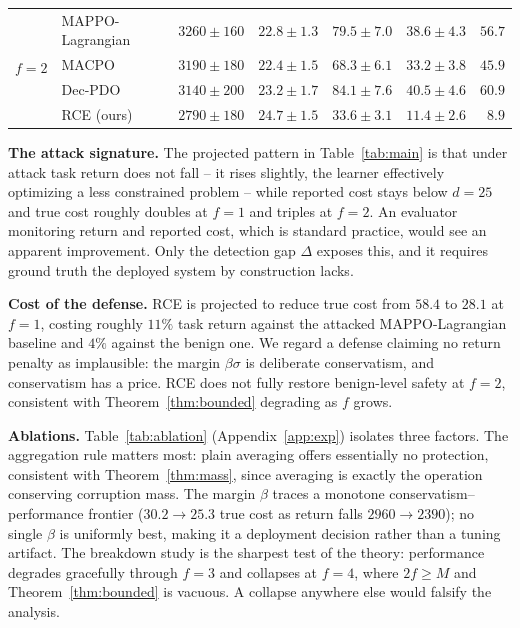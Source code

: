 \documentclass{article}
\begin{document}
\begin{table}[t]
\begin{tabular}{@{}llrrrrr@{}}
\midrule
\multirow{4}{*}{$f{=}2$}
 & MAPPO-Lagrangian & $3260 \pm 160$ & $22.8 \pm 1.3$ & $79.5 \pm 7.0$ & $38.6 \pm 4.3$ & $56.7$ \\
 & MACPO            & $3190 \pm 180$ & $22.4 \pm 1.5$ & $68.3 \pm 6.1$ & $33.2 \pm 3.8$ & $45.9$ \\
 & Dec-PDO          & $3140 \pm 200$ & $23.2 \pm 1.7$ & $84.1 \pm 7.6$ & $40.5 \pm 4.6$ & $60.9$ \\
 & RCE (ours)       & $2790 \pm 180$ & $24.7 \pm 1.5$ & $33.6 \pm 3.1$ & $11.4 \pm 2.6$ & $8.9$ \\
\bottomrule
\end{tabular}
\end{table}

\textbf{The attack signature.} The projected pattern in Table~\ref{tab:main} is that under attack task return does not fall -- it rises slightly, the learner effectively optimizing a less constrained problem -- while reported cost stays below $d=25$ and true cost roughly doubles at $f=1$ and triples at $f=2$. An evaluator monitoring return and reported cost, which is standard practice, would see an apparent improvement. Only the detection gap $\Delta$ exposes this, and it requires ground truth the deployed system by construction lacks.

\textbf{Cost of the defense.} RCE is projected to reduce true cost from $58.4$ to $28.1$ at $f=1$, costing roughly $11\%$ task return against the attacked MAPPO-Lagrangian baseline and $4\%$ against the benign one. We regard a defense claiming no return penalty as implausible: the margin $\beta\sigma$ is deliberate conservatism, and conservatism has a price. RCE does not fully restore benign-level safety at $f=2$, consistent with Theorem~\ref{thm:bounded} degrading as $f$ grows.


\textbf{Ablations.} Table~\ref{tab:ablation} (Appendix~\ref{app:exp}) isolates three factors. The aggregation rule matters most: plain averaging offers essentially no protection, consistent with Theorem~\ref{thm:mass}, since averaging is exactly the operation conserving corruption mass. The margin $\beta$ traces a monotone conservatism--performance frontier ($30.2\!\to\!25.3$ true cost as return falls $2960\!\to\!2390$); no single $\beta$ is uniformly best, making it a deployment decision rather than a tuning artifact. The breakdown study is the sharpest test of the theory: performance degrades gracefully through $f=3$ and collapses at $f=4$, where $2f \ge M$ and Theorem~\ref{thm:bounded} is vacuous. A collapse anywhere else would falsify the analysis.
\end{document}
